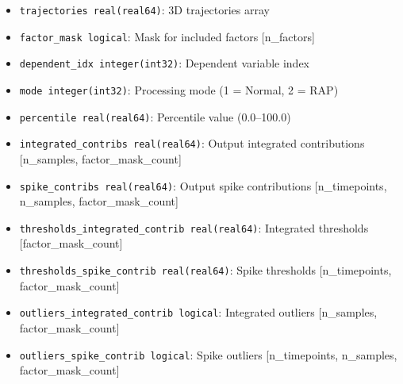 \begin{enumerate}
\begin{enumerate}
\begin{itemize}
                    \item \texttt{trajectories real(real64)}: 3D trajectories array
                          
                    \item \texttt{factor\_mask logical}: Mask for included factors [n\_factors]
                          
                    \item \texttt{dependent\_idx integer(int32)}: Dependent variable index
                          
                    \item \texttt{mode integer(int32)}: Processing mode (1 = Normal, 2 =
                          RAP)
                          
                    \item \texttt{percentile real(real64)}: Percentile value (0.0--100.0)
                          
                    \item \texttt{integrated\_contribs real(real64)}: Output integrated contributions
                          [n\_samples, factor\_mask\_count]
                          
                    \item \texttt{spike\_contribs real(real64)}: Output spike contributions
                          [n\_timepoints, n\_samples, factor\_mask\_count]
                          
                    \item \texttt{thresholds\_integrated\_contrib real(real64)}: Integrated
                          thresholds [factor\_mask\_count]
                          
                    \item \texttt{thresholds\_spike\_contrib real(real64)}: Spike thresholds
                          [n\_timepoints, factor\_mask\_count]
                          
                    \item \texttt{outliers\_integrated\_contrib logical}: Integrated outliers
                          [n\_samples, factor\_mask\_count]
                          
                    \item \texttt{outliers\_spike\_contrib logical}: Spike outliers [n\_timepoints,
                    n\_samples, factor\_mask\_count]
                    

\end{itemize}
\end{enumerate}
\end{enumerate}
